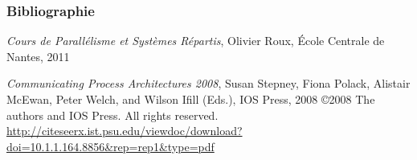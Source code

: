 \documentclass[slidetop,11pt]{beamer}
\begin{document}
\begin{frame} 
\frametitle{Bibliographie}

\begin{thebibliography}{Cpa2008}
 {\textit{Cours de Parallélisme et Systèmes Répartis}, Olivier Roux, \'Ecole Centrale de Nantes, 2011}

 {\textit{Communicating Process Architectures 2008}, Susan Stepney, Fiona Polack, Alistair McEwan, Peter Welch, and Wilson Ifill (Eds.), IOS Press, 2008
\copyright 2008 The authors and IOS Press. All rights reserved.\\
\url{http://citeseerx.ist.psu.edu/viewdoc/download?doi=10.1.1.164.8856&rep=rep1&type=pdf}}
\end{thebibliography}
\end{frame}
\end{document}
